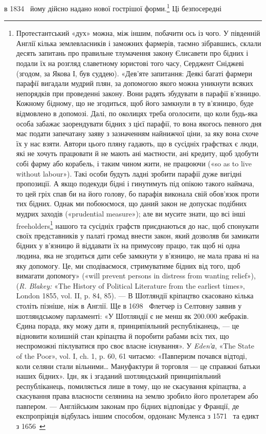 \parcont{}  %
в 1834~ йому дійсно надано нової гострішої форми.\footnote{
Протестантський «дух» можна, між іншим, побачити ось із чого.
У південній Англії кілька землевласників і заможних фармерів, таємно
зібравшись, склали десять запитань про правильне тлумачення закону
Єлисавети про бідних і подали їх на розгляд славетному юристові того
часу, Серджент Сніджеві (згодом, за Якова І, був суддею). «Дев’яте запитання:
Деякі багаті фармери парафії вигадали мудрий плян, за допомогою
якого можна уникнути всяких непорядків при проведенні закону.
Вони радять збудувати в парафії в’язницю. Кожному бідному, що не
згодиться, щоб його замкнули в ту в’язницю, буде відмовлено в допомозі.
Далі, по околицях треба оголосити, що коли будь-яка особа забажає
заорендувати бідних з цієї парафії, то вона якогось певного дня
має подати запечатану заяву з зазначенням найнижчої ціни, за яку вона
схоче їх у нас взяти. Автори цього пляну гадають, що в сусідніх графствах
є люди, які не хочуть працювати й не мають ані маєтности, ані
кредиту, щоб здобути собі фарму або корабель, і таким чином жити,
не працюючи («so as to live without labour»). Такі особи будуть ладні
зробити парафії дуже вигідні пропозиції. А якщо подекуди бідні і гинутимуть
під опікою такого наймача, то цей гріх спав би на його голову,
бо парафія виконала свій обов’язок проти тих бідних. Однак ми побоюємося,
що даний закон не допускає подібних мудрих заходів («prudential
measure»); але ви мусите знати, що всі інші freeholders\footnote*{
— вільні дрібні господарства. \emph{Ред.}
} нашого та
сусідніх графств приєднаються до нас, щоб спонукати своїх представників
у палаті громад внести закон, який дозволяв би замикати бідних у
в’язницю й віддавати їх на примусову працю, так щоб ні одна людина,
яка не згодиться дати себе замкнути у в’язницю, не мала права ні на яку
допомогу. Це, ми сподіваємося, стримуватиме бідних від того, щоб вимагати
допомогу» («will prevent persons in distress from wanting relief»),
(\emph{R. Blakey:} «The History of Political Literature from the earliest times»,
London 1855, vol. II, p. 84, 85). — В Шотляндії кріпацтво скасовано
кілька століть пізніше, ніж в Англії. Ще в 1698~ Флетчер із Селтовну
заявив у шотляндському парламенті: «У Шотляндії є не менш як \num{200.000}
жебраків. Єдина порада, яку можу дати я, принципіяльний республіканець,
— це відновити колишній стан кріпацтва й поробити рабами всіх
тих, що неспроможні піклуватися про своє власне існування». У \emph{Eden’а},
«The State of the Poor», vol. I, ch. 1, p. 60, 61 читаємо: «Павперизм почався
відтоді, коли селяни стали вільними\dots{} Мануфактури й торговля —
це справжні батьки наших бідних». Ідн, як і згаданий шотляндський
принципіяльний республіканець, помиляється лише в тому, що не скасування
кріпацтва, а скасування права власности селянина на землю
зробило його пролетарем або павпером. — Англійським законам про
бідних відповідає у Франції, де експропріяція відбулась іншим способом,
ордонанс Муленса з 1571~ та едикт з 1656~
} Ці безпосередні
